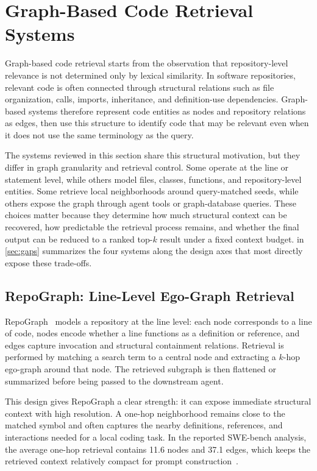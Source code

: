 \section{Graph-Based Code Retrieval Systems}
\label{sec:graph-systems}

Graph-based code retrieval starts from the observation that repository-level relevance is not determined only by lexical similarity. In software repositories, relevant code is often connected through structural relations such as file organization, calls, imports, inheritance, and definition-use dependencies. Graph-based systems therefore represent code entities as nodes and repository relations as edges, then use this structure to identify code that may be relevant even when it does not use the same terminology as the query.

The systems reviewed in this section share this structural motivation, but they differ in graph granularity and retrieval control. Some operate at the line or statement level, while others model files, classes, functions, and repository-level entities. Some retrieve local neighborhoods around query-matched seeds, while others expose the graph through agent tools or graph-database queries. These choices matter because they determine how much structural context can be recovered, how predictable the retrieval process remains, and whether the final output can be reduced to a ranked top-$k$ result under a fixed context budget.  in \cref{sec:gaps} summarizes the four systems along the design axes that most directly expose these trade-offs.

\subsection{RepoGraph: Line-Level Ego-Graph Retrieval}
\label{sec:repograph}

RepoGraph~\cite{ouyang2025repograph} models a repository at the line level: each node corresponds to a line of code, nodes encode whether a line functions as a definition or reference, and edges capture invocation and structural containment relations. Retrieval is performed by matching a search term to a central node and extracting a $k$-hop ego-graph around that node. The retrieved subgraph is then flattened or summarized before being passed to the downstream agent.

This design gives RepoGraph a clear strength: it can expose immediate structural context with high resolution. A one-hop neighborhood remains close to the matched symbol and often captures the nearby definitions, references, and interactions needed for a local coding task. In the reported SWE-bench analysis, the average one-hop retrieval contains 11.6 nodes and 37.1 edges, which keeps the retrieved context relatively compact for prompt construction~\cite{ouyang2025repograph}.

